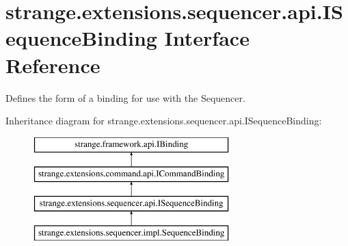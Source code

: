 \hypertarget{interfacestrange_1_1extensions_1_1sequencer_1_1api_1_1_i_sequence_binding}{\section{strange.\-extensions.\-sequencer.\-api.\-I\-Sequence\-Binding Interface Reference}
\label{interfacestrange_1_1extensions_1_1sequencer_1_1api_1_1_i_sequence_binding}
}


Defines the form of a binding for use with the Sequencer.  


Inheritance diagram for strange.\-extensions.\-sequencer.\-api.\-I\-Sequence\-Binding\-:\begin{figure}[H]
\begin{center}
\leavevmode
\includegraphics[height=4.000000cm]{interfacestrange_1_1extensions_1_1sequencer_1_1api_1_1_i_sequence_binding}
\end{center}
\end{figure}
